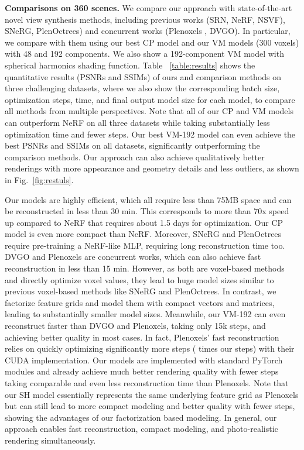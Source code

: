 \documentclass[runningheads]{llncs}
\newcommand{\boldstartspace}[1]{\vspace{0.1in}\noindent\textbf{#1}}
\begin{document}
\boldstartspace{Comparisons on 360 scenes.}
We compare our approach with state-of-the-art novel view synthesis methods, including previous works (SRN\cite{sitzmann2019scene}, NeRF\cite{mildenhall2020nerf}, NSVF\cite{liu2020neural}), SNeRG\cite{hedman2021baking}, PlenOctrees\cite{yu2021plenoctrees}) and concurrent works (Plenoxels \cite{yu2021plenoxels}, DVGO\cite{sun2021direct}).
In particular, we compare with them using our best CP model and our VM models (300 voxels) with 48 and 192 components.
We also show a 192-component VM model with spherical harmonics shading function.
Table ~\ref{table:results} shows the quantitative results (PSNRs and SSIMs) of ours and comparison methods on three challenging datasets, where we also show the corresponding batch size, optimization steps, time, and final output model size for each model, to compare all methods from multiple perspectives. 
Note that all of our CP and VM models can outperform NeRF on all three datasets while taking substantially less optimization time and fewer steps.
Our best VM-192 model can even achieve the best PSNRs and SSIMs on all datasets, significantly outperforming the comparison methods.
Our approach can also achieve qualitatively better renderings with more appearance and geometry details and less outliers, as shown in 
Fig.~\ref{fig:restuls}.








Our models are highly efficient, which all require less than 75MB space and can be reconstructed in less than 30 min.
This corresponds to more than 70x speed up compared to NeRF that requires about 1.5 days for optimization.
Our CP model is even more compact than NeRF.
Moreover, SNeRG and PlenOctrees require pre-training a NeRF-like MLP, requiring long reconstruction time too.
DVGO and Plenoxels are concurrent works, which can also achieve fast reconstruction in less than 15 min. 
However, as both are voxel-based methods and directly optimize voxel values, they lead to huge model sizes 
similar to previous voxel-based methods like SNeRG and PlenOctrees.
In contrast, we factorize feature grids and model them with compact vectors and matrices, leading to substantially smaller model sizes.
Meanwhile, our VM-192 can even reconstruct faster than DVGO and Plenoxels, taking only 15k steps, and achieving better quality in most cases. 
In fact, Plenoxels' fast reconstruction relies on quickly optimizing significantly more steps ( times our steps) with their CUDA implementation. 
Our models are implemented with standard PyTorch modules and already achieve much better rendering quality with fewer steps taking comparable and even less reconstruction time than Plenoxels. Note that our SH model essentially represents the same underlying feature grid as Plenoxels but can still lead to more compact modeling and better quality with fewer steps, showing the advantages of our factorization based modeling.
In general, our approach enables fast reconstruction, compact modeling, and photo-realistic rendering simultaneously.
\end{document}
